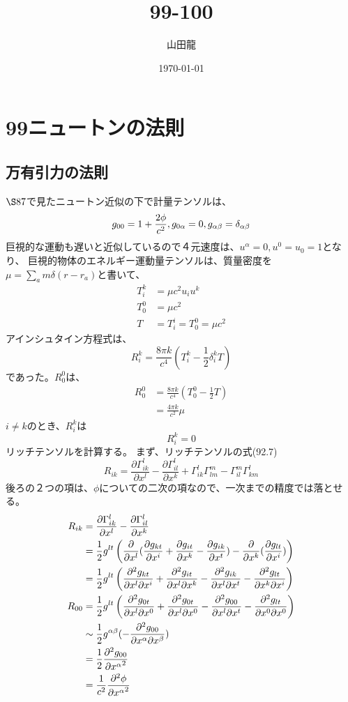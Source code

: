 \documentclass{jsarticle}
\date{\today}
\author{山田龍}
\title{99-100}
\newcommand{\pder}[2][]{\frac{\partial#1}{\partial#2}}
\newcommand{\ppder}[2][]{\frac{\partial^2#1}{{\partial#2}^2}}
\newcommand{\pikdergx}[3][]{\frac{\partial^2 g_{#1}}{{\partial x^{#2} \partial x^{#3}}}}
\newcommand{\pderx}[2][]{\pder[#1]{x^{#2}}}
\newcommand{\pdergx}[2][]{\pderx[g_{#1}]{#2}}
\newcommand{\half}{\frac{1}{2}}
\newcommand{\beq}{\begin{equation}}
\newcommand{\eeq}{\end{equation}}
\newcommand{\GaT}[3]{\Gamma^{#1}_{#2 #3}}
\begin{document}
\maketitle
\section{99ニュートンの法則}
\subsection{万有引力の法則}
$\S 87$で見たニュートン近似の下で計量テンソルは、
\beq
g_{00} = 1 + \frac{2\phi}{c^2},g_{0\al} = 0,g_{\al \be} = \delta_{\al \be}
\eeq
巨視的な運動も遅いと近似しているので４元速度は、$u^\alpha = 0, u^0 = u_0 = 1$となり、
巨視的物体のエネルギー運動量テンソルは、質量密度を$\mu = \sum_a m \delta(r-r_a)$と書いて、
\begin{align}
    T^k_{i} &= \mu c^2 u_i u^k\\
    T^0_0 &= \mu c^2\\
    T &= T^i_i = T^0_0 = \mu c^2
\end{align}
アインシュタイン方程式は、
\beq
    R^k_i = \frac{8\pi k}{c^4} (T^k_i - \half \delta^k_i T)
\eeq
であった。$R^0_0$は、
\begin{align}
    R^0_0 &= \frac{8\pi k}{c^4} (T^0_0 - \half T)\\
        &= \frac{4\pi k}{c^2} \mu
\end{align}
$i \neq k$のとき、$R^k_i$は
\beq
    R^k_i = 0
\eeq
リッチテンソルを計算する。
まず、リッチテンソルの式(92.7)
\beq
    R_{ik} =  \pder[\Gamma^l_{ik}]{x^l} - \pder[\Gamma^l_{il}]{x^k}
    + \GaT{l}{i}{k}\GaT{m}{l}{m} - \GaT{m}{i}{l}\GaT{l}{k}{m}
\eeq
後ろの２つの項は、$\phi$についての二次の項なので、一次までの精度では落とせる。
\begin{align}
    R_{ik} &= \pder[\Gamma^l_{ik}]{x^l} - \pder[\Gamma^l_{il}]{x^k}\\
            &= \half g^{lt} 
            \left( \pderx[]{l}(\pdergx[kt]{i} + \pdergx[it]{k} - \pdergx[ik]{t}) - \pderx[]{k}(\pdergx[lt]{i})\right)\\
            &= \half g^{lt} \left(
            \pikdergx[kt]{l}{i} + \pikdergx[it]{l}{k} - \pikdergx[ik]{l}{t} - \pikdergx[lt]{k}{i}
            \right)\\
    R_{00} &= \half g^{lt} \left(
            \pikdergx[0t]{l}{0} + \pikdergx[0t]{l}{0} - \pikdergx[00]{l}{t} - \pikdergx[lt]{0}{0}
            \right)\\
           &\sim \half g^{\al \be}(- \pikdergx[00]{\al}{\be} )\\
           &= \half \ppder[g_{00}]{x^\al}\\
           &= \frac{1}{c^2} \ppder[\phi]{x^\al}
\end{align}
\end{document}
